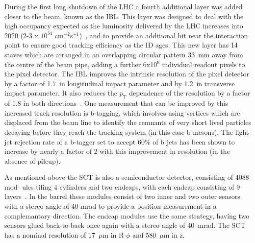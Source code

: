 During the first long shutdown of the LHC a fourth additional layer was added closer to the beam, known as the \gls{IBL}.  
This layer was designed to deal with the high occupancy expected as the luminosity delivered by the LHC increases into 2020 (2-3 x $10^{34}$ cm$^{-2}$s$^{-1}$)~\cite{IBL1}, and to provide an additional hit near the interaction point to ensure good tracking efficiency as the ID ages.  
This new layer has 14 staves which are arranged in an overlapping circular pattern 33~mm away from the centre of the beam pipe, adding a further 6x10$^6$ individual readout pixels to the pixel detector.
The IBL improves the intrinsic resolution of the pixel detector by a factor of 1.7~in longitudinal impact parameter and by 1.2~in transverse impact parameter.  
It also reduces the $p_{\mathrm T}$ dependence of the resolution by a factor of 1.8 in both directions~\cite{IBL2}.  
One measurement that can be improved by this increased track resolution is b-tagging, which involves using vertices which are displaced from the beam line to identify the remnants of very short lived particles decaying before they reach the tracking system (in this case b mesons).  
The light jet rejection rate of a b-tagger set to accept 60\% of b jets has been shown to increase by nearly a factor of 2 with this improvement in resolution (in the absence of pileup).

As mentioned above the SCT is also a semiconductor detector, consisting of 4088 mod- ules tiling 4 cylinders and two endcaps, with each endcap consisting of 9 layers~\cite{JOIATLAS}.  
In the barrel these modules consist of two inner and two outer sensors with a stereo angle of 40 mrad to provide a position measurement in a complemantary direction.  
The endcap modules use the same strategy, having two sensors glued back-to-back once again with a stereo angle of 40~mrad.  
The SCT has a nominal resolution of 17~$\mu$m in R-$\phi$ and 580~$\mu$m in z.  

